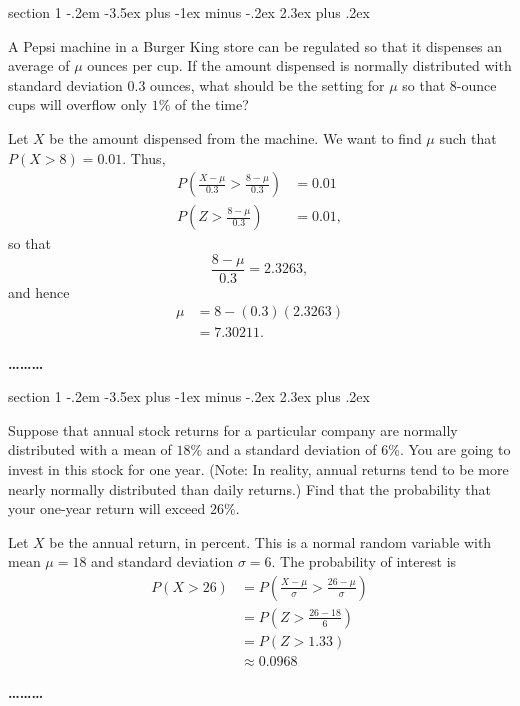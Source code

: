 \documentclass[answers,11pt]{exam}
\makeatletter
\newenvironment{problem}{\@startsection
       {section}
       {1}
       {-.2em}
       {-3.5ex plus -1ex minus -.2ex}
       {2.3ex plus .2ex}
       {\pagebreak[3]%
       \large\bf\noindent{Problem }
       }
       }
       {%
       \begin{center}\large\bf \ldots\ldots\ldots\end{center}}
\makeatother
\begin{document}
\begin{problem}{}

A Pepsi machine in a Burger King store can be regulated so that it dispenses
an average of $\mu$ ounces per cup. If the amount dispensed is normally
distributed with standard deviation $0.3$ ounces, what should be the setting
for $\mu$ so that $8$-ounce cups will overflow only $1\%$ of the time?

\begin{solution}
Let $X$ be the amount dispensed from the machine.  We want to find $\mu$ such
that $P(X > 8) = 0.01$.  Thus,
\begin{align*}
  P\left(\frac{X - \mu}{0.3} > \frac{8 - \mu}{0.3}\right) &= 0.01 \\
  P\left(Z > \frac{8 - \mu}{0.3}\right) &= 0.01,
\end{align*}
so that
\[
  \frac{8 - \mu}{0.3} = 2.3263,
\]
and hence
\begin{align*}
 \mu &= 8 - (0.3) (2.3263) \\
     &= 7.30211.
\end{align*}
\end{solution}

\end{problem}




\begin{problem}{}

Suppose that annual stock returns for a particular company are normally
distributed with a mean of $18\%$ and a standard deviation of $6\%$. You are
going to invest in this stock for one year.  (Note: In reality, annual returns
tend to be more nearly normally distributed than daily returns.)
Find that the probability that your one-year return will exceed $26\%$.

\begin{solution}
Let $X$ be the annual return, in percent.  This is a normal random variable
with mean $\mu = 18$ and standard deviation $\sigma = 6$.  The probability of
interest is
\begin{align*}
  P(X > 26)
    &= P\left(\frac{X - \mu}{\sigma} > \frac{26 - \mu}{\sigma}\right) \\
    &= P\left(Z > \frac{26 - 18}{6}\right) \\
    &= P(Z > 1.33) \\
    &\approx 0.0968
\end{align*}
\end{solution}


\end{problem}
\end{document}
